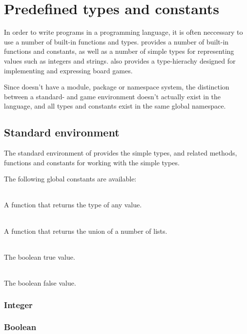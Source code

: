 \section{Predefined types and constants}
\label{sec:predefined}

In order to write programs in a programming language, it is often neccessary to use a number of built-in
functions and types. \productname{} provides a number of built-in functions and constants, as well as 
a number of simple types for representing values such as integers and strings. \productname{} also provides
a type-hierachy designed for implementing and expressing board games.

Since \productname{} doesn't have a module, package or namespace system, the distinction between a standard-
and game environment doesn't actually exist in the language, and all types and constants exist in the same
global namespace.

\subsection{Standard environment}

The standard environment of \productname{} provides the simple types, and related methods, functions and
constants for working with the simple types.

The following global constants are available:

\begin{dlist}
  \item {}\\
    A function that returns the type of any value.
  \item {}\\
    A function that returns the union of a number of lists.
  \item {}\\
    The boolean true value.
  \item {}\\
    The boolean false value.
\end{dlist}

\subsubsection{Integer}

\subsubsection{Boolean}

